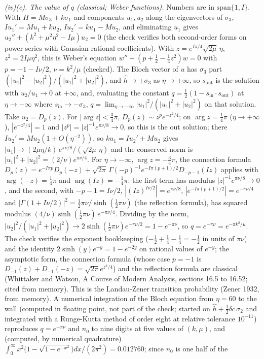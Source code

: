 \emph{(iv)(c). The value of $q$ (classical; Weber functions).} Numbers are in $\mathrm{span}\{1, I\}$. With $H = M\sigma_{3} + k\sigma_{1}$ and components $u_{1}, u_{2}$ along the eigenvectors of $\sigma_{3}$, $Iu_{1}' = Mu_{1} + ku_{2}$, $Iu_{2}' = ku_{1} - Mu_{2}$, and eliminating $u_{1}$ gives $u_{2}'' + (k^{2} + \mu^{2}\eta^{2} - I\mu)u_{2} = 0$ (the check verifies both second-order forms on power series with Gaussian rational coefficients). With $z = e^{I\pi/4}\sqrt{2\mu}\,\eta$, $z^{2} = 2I\mu\eta^{2}$, this is Weber's equation $w'' + (p + \tfrac12 - \tfrac14z^{2})w = 0$ with $p = -1 - I\nu/2$, $\nu = k^{2}/\mu$ (checked). The Bloch vector of $u$ has $\sigma_{3}$ part $(|u_{1}|^{2} - |u_{2}|^{2})/(|u_{1}|^{2} + |u_{2}|^{2})$, and $\hat h \to \pm\sigma_{3}$ as $\eta \to \pm\infty$, so $s_{\mathrm{out}}$ is the solution with $u_{2}/u_{1} \to 0$ at $+\infty$, and, evaluating the constant $q = \tfrac12(1 - s_{\mathrm{in}}\cdot s_{\mathrm{out}})$ at $\eta \to -\infty$ where $s_{\mathrm{in}} \to -\sigma_{3}$, $q = \lim_{\eta\to-\infty}|u_{1}|^{2}/(|u_{1}|^{2} + |u_{2}|^{2})$ on that solution. Take $u_{2} = D_{p}(z)$. For $|\arg z| < \tfrac34\pi$, $D_{p}(z) \sim z^{p}e^{-z^{2}/4}$; on $\arg z = \tfrac14\pi$ ($\eta \to +\infty$), $|e^{-z^{2}/4}| = 1$ and $|z^{p}| = |z|^{-1}e^{\pi\nu/8} \to 0$, so this is the out solution; there $Iu_{2}' = Mu_{2}(1 + O(\eta^{-2}))$, so $ku_{1} = Iu_{2}' + Mu_{2}$ gives $|u_{1}| \to (2\mu\eta/k)\,e^{\pi\nu/8}/(\sqrt{2\mu}\,\eta)$ and the conserved norm is $|u_{1}|^{2} + |u_{2}|^{2} = (2/\nu)e^{\pi\nu/4}$. For $\eta \to -\infty$, $\arg z = -\tfrac34\pi$, the connection formula $D_{p}(z) = e^{-I\pi p}D_{p}(-z) + \sqrt{2\pi}\,\Gamma(-p)^{-1}e^{-I\pi(p+1)/2}D_{-p-1}(Iz)$ applies with $\arg(-z) = \tfrac14\pi$ and $\arg(Iz) = -\tfrac14\pi$: the first term has modulus $|z|^{-1}e^{\pi\nu/8} \to 0$, and the second, with $-p - 1 = I\nu/2$, $|(Iz)^{I\nu/2}| = e^{\pi\nu/8}$, $|e^{-I\pi(p+1)/2}| = e^{-\pi\nu/4}$ and $|\Gamma(1 + I\nu/2)|^{2} = \tfrac12\pi\nu/\sinh(\tfrac12\pi\nu)$ (the reflection formula), has squared modulus $(4/\nu)\sinh(\tfrac12\pi\nu)\,e^{-\pi\nu/4}$. Dividing by the norm, $|u_{2}|^{2}/(|u_{1}|^{2} + |u_{2}|^{2}) \to 2\sinh(\tfrac12\pi\nu)e^{-\pi\nu/2} = 1 - e^{-\pi\nu}$, so $q = e^{-\pi\nu} = e^{-\pi k^{2}/\mu}$. The check verifies the exponent bookkeeping ($-\tfrac12 + \tfrac14 - \tfrac14 = -\tfrac12$ in units of $\pi\nu$) and the identity $2\sinh(y)e^{-y} = 1 - e^{-2y}$ on rational values of $e^{-y}$; the asymptotic form, the connection formula (whose case $p = -1$ is $D_{-1}(z) + D_{-1}(-z) = \sqrt{2\pi}e^{z^{2}/4}$) and the reflection formula are classical (Whittaker and Watson, A Course of Modern Analysis, sections 16.5 to 16.52; cited from memory). This is the Landau-Zener transition probability (Zener 1932, from memory). A numerical integration of the Bloch equation from $\eta = 60$ to the wall (computed in floating point, not part of the check; started on $\hat h + \tfrac12\delta c\,\sigma_{2}$ and integrated with a Runge-Kutta method of order eight at relative tolerance $10^{-11}$) reproduces $q = e^{-\pi\nu}$ and $n_{0}$ to nine digits at five values of $(k, \mu)$, and (computed, by numerical quadrature) $\int_{0}^{\infty}x^{2}\bigl(1 - \sqrt{1 - e^{-x^{2}}}\bigr)dx/(2\pi^{2}) = 0.012760$; since $n_{0}$ is one half of the 